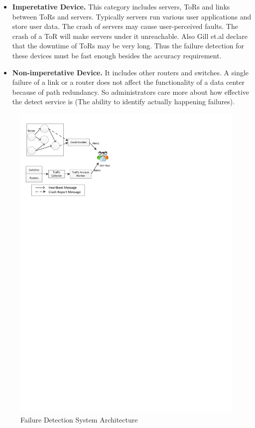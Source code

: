 \documentclass{sig-alternate-05-2015}
\begin{document}
\begin{itemize}
\item \textbf{Imperetative Device.} This category includes servers, ToRs and links between ToRs and servers. Typically servers run various user applications and store user data. The crash of servers may cause user-perceived faults. The crash of a ToR will make servers under it unreachable. Also Gill et.al declare that the downtime of ToRs may be very long. Thus the failure detection for these devices must be fast enough besides the accuracy requirement.

\item \textbf{Non-imperetative Device.} It includes other routers and switches. A single failure of a link or a router does not affect the functionality of a data center because of path redundancy. So administrators care more about how effective the detect service is (The ability to identify actually happening failures).
    
\end{itemize}

\begin{figure}
\centering
\includegraphics{system}
\caption{Failure Detection System Architecture}
\end{figure}
\end{document}
